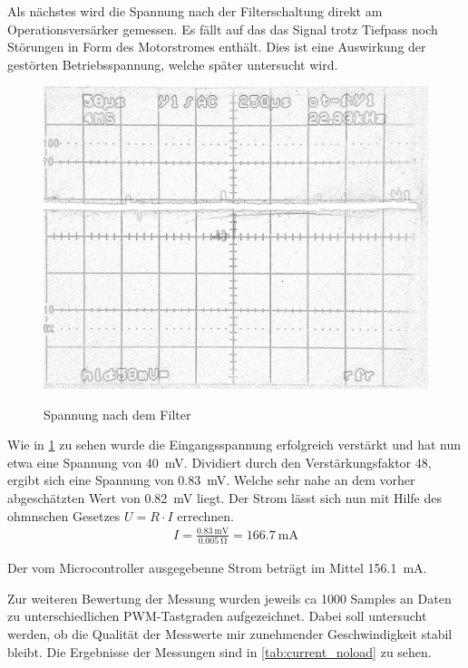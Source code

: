 Als nächstes wird die Spannung nach der Filterschaltung direkt am Operationsversärker gemessen. Es fällt auf das das Signal trotz Tiefpass noch Störungen in Form des Motorstromes enthält.
Dies ist eine Auswirkung der gestörten Betriebsspannung, welche später untersucht wird.


\begin{figure}[H]
\centering
\includegraphics[width=.8\textwidth]{filter_ausgang.png}\\
\caption{Spannung nach dem Filter}%
\label{fig:filter_ausgang}
\end{figure}


Wie in \cref{fig:filter_ausgang} zu sehen wurde die Eingangsspannung erfolgreich verstärkt und hat nun etwa eine Spannung von \SI{40}{\mV}. Dividiert durch den Verstärkungsfaktor 48, ergibt sich eine Spannung von 
\SI{0,83}{\mV}. Welche sehr nahe an dem vorher abgeschätzten Wert von \SI{0,82}{\mV} liegt. Der Strom lässt sich nun mit Hilfe des ohmnschen Gesetzes $U=R\cdot I$ errechnen.
\begin{align*}
I=\frac{\SI{0,83}{\mV}}{\SI{0,005}{\ohm}}=\SI{166,7}{\mA}
\end{align*}

Der vom Microcontroller ausgegebenne Strom beträgt im Mittel \SI{156,1}{\mA}.

Zur weiteren Bewertung der Messung wurden jeweils ca 1000 Samples an Daten zu unterschiedlichen PWM-Tastgraden aufgezeichnet.
Dabei soll untersucht werden, ob die Qualität der Messwerte mir zunehmender Geschwindigkeit stabil bleibt.
Die Ergebnisse der Messungen sind in \cref{tab:current_noload} zu sehen.

